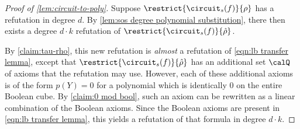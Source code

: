 \begin{proof}[Proof of \cref{lem:circuit-to-poly}]
  Suppose $\restrict{\circuit_s(f)}{\rho}$ has a refutation in degree
  $d$.  By \cref{lem:sos degree polynomial substitution}, there then
  exists a degree $d \cdot k$ refutation of
  $\restrict{\circuit_s(f)}{\hat\rho}$.

  By \cref{claim:tau-rho}, this new refutation is \emph{almost} a
  refutation of \eqref{eqn:lb transfer lemma}, except that
  $\restrict{\circuit_s(f)}{\hat\rho}$ has an additional set $\calQ$
  of axioms that the refutation may use.  However, each of these
  additional axioms is of the form $p(Y) = 0$ for a polynomial which
  is identically $0$ on the entire Boolean cube.  By \cref{claim:0 mod
    bool}, such an axiom can be rewritten as a linear combination of
  the Boolean axioms.  Since the Boolean axioms are present in
  \eqref{eqn:lb transfer lemma}, this yields a refutation of that
  formula in degree $d \cdot k$.
\end{proof}


